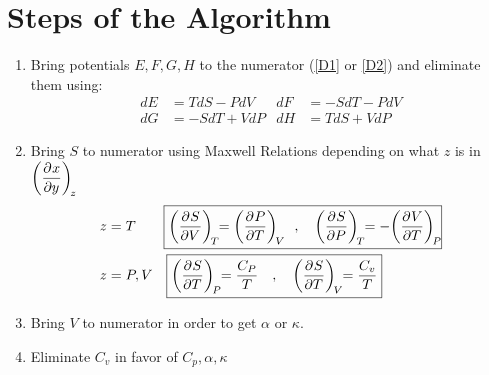 \documentclass{article}
\begin{document}
\section*{Steps of the Algorithm}
    \begin{enumerate}
        \item Bring potentials $E,F,G,H$ to the numerator (\ref{D1} or \ref{D2}) and eliminate them using:
        \begin{align*}
            dE&=TdS-PdV
            &
            dF&=-SdT-PdV
            \\
            dG&=-SdT+VdP
            &
            dH&=TdS+VdP
        \end{align*}
        \item Bring $S$ to numerator using Maxwell Relations depending on what $z$ is in $\displaystyle\pder{x}{y}[z]$
        \begin{align*}
            z&=T\qquad\boxed{\pder{S}{V}[T]=\pder{P}{T}[V]\quad,\quad \pder{S}{P}[T]=-\pder{V}{T}[P]}
            \\
            z&=P,V\quad\boxed{\pder{S}{T}[P]=\frac{C_P}{T}\quad,\quad \pder{S}{T}[V]=\frac{C_v}{T}}
        \end{align*}
        \item Bring $V$ to numerator in order to get $\alpha$ or $\kappa$. 
        \item Eliminate $C_v$ in favor of $C_p,\alpha,\kappa$
    \end{enumerate} 
\end{document}
